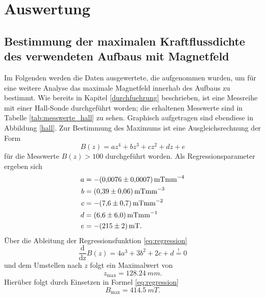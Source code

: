 \section{Auswertung}
\subsection{Bestimmung der maximalen Kraftflussdichte des verwendeten Aufbaus mit Magnetfeld}
Im Folgenden werden die Daten ausgewertete, die aufgenommen wurden, um für eine weitere Analyse das maximale Magnetfeld innerhab des Aufbaus zu bestimmt. Wie bereits in Kapitel \ref{durchfuehrung} beschrieben, ist eine Messreihe mit einer Hall-Sonde durchgeführt worden; die erhaltenen Messwerte sind in Tabelle \ref{tab:messwerte_hall} zu sehen.
Graphisch aufgetragen sind ebendiese in Abbildung \ref{hall}. Zur Bestimmung des Maximums ist eine Ausgleichsrechnung der Form
\begin{equation}
B(z)=az^4+bz^3+cz^2+dz+e
\label{eq:regression}
\end{equation}
für die Messwerte $B(z)>100$ durchgeführt worden.
Als Regressionsparameter ergeben sich
\begin{align*}
  a&=-\SI{0,0076 \pm 0,0007}{mTmm^{-4}}\\
  b&=\SI{0,39 \pm 0,06}{mTmm^{-3}}\\
  c&=-\SI{7,6 \pm 0,7}{mTmm^{-2}}\\
  d&=\SI{6,6 \pm 6,0}{mTmm^{-1}}\\
  e&=-\SI{215 \pm 2}{mT}.
\end{align*}
Über die Ableitung der Regressionsfunktion \eqref{eq:regression}
\begin{equation}
\frac{\text{d}}{\text{dz}}B(z)=4a^3+3b^2+2c+d \stackrel{!}{=} 0
\end{equation}
und dem Umstellen nach $z$ folgt ein Maximalwert von
\begin{equation}
 z_\text{max}=\SI{128,24}{mm}.
\end{equation}
Hierüber folgt durch Einsetzen in Formel \eqref{eq:regression}
\begin{equation}
B_\text{max}=\SI{414,5}{mT}.
\end{equation}
